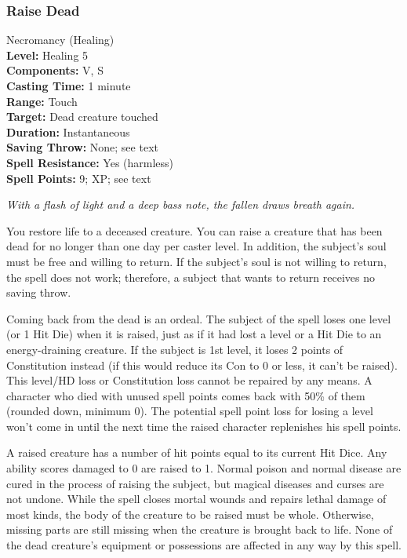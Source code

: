 \subsubsection{Raise Dead}
\label{Spell:RaiseDead}
Necromancy (Healing)
\\ \textbf{Level:} Healing 5
\\ \textbf{Components:} V, S
\\ \textbf{Casting Time:} 1 minute
\\ \textbf{Range:} Touch
\\ \textbf{Target:} Dead creature touched
\\ \textbf{Duration:} Instantaneous
\\ \textbf{Saving Throw:} None; see text
\\ \textbf{Spell Resistance:} Yes (harmless)
\\ \textbf{Spell Points:} 9; XP; see text

\emph{With a flash of light and a deep bass note, the fallen draws breath again.}

You restore life to a deceased creature. 
You can raise a creature that has been dead for no longer than one day per caster level. 
In addition, the subject's soul must be free and willing to return. 
If the subject's soul is not willing to return, the spell does not work; 
therefore, a subject that wants to return receives no saving throw.

Coming back from the dead is an ordeal. 
The subject of the spell loses one level (or 1 Hit Die) when it is raised, 
just as if it had lost a level or a Hit Die to an energy-draining creature. 
If the subject is 1st level, 
it loses 2 points of Constitution instead (if this would reduce its Con to 0 or less, it can't be raised). 
This level/HD loss or Constitution loss cannot be repaired by any means. 
A character who died with unused spell points comes back with 50\% of them (rounded down, minimum 0).
The potential spell point loss for losing a level won't come in until the next time the raised character replenishes his spell points.

A raised creature has a number of hit points equal to its current Hit Dice. 
Any ability scores damaged to 0 are raised to 1. 
Normal poison and normal disease are cured in the process of raising the subject, 
but magical diseases and curses are not undone. 
While the spell closes mortal wounds and repairs lethal damage of most kinds, 
the body of the creature to be raised must be whole. 
Otherwise, missing parts are still missing when the creature is brought back to life. 
None of the dead creature's equipment or possessions are affected in any way by this spell.

